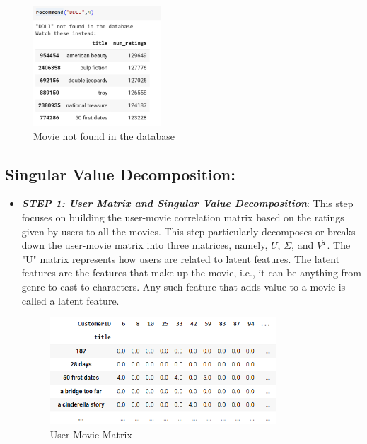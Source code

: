 \documentclass[a4paper,10pt]{article}
\begin{document}
\begin{enumerate}
\begin{itemize}
\begin{figure}[H]
        
        \centering
        \includegraphics[height=4.5cm]{figures/not_in_db.png}
        \caption{Movie not found in the database}
        \label{not in db}
\end{figure}
\end{itemize}


\subsection{Singular Value Decomposition:}
    \vspace{2pt}
    
    \begin{itemize}
        \item \textbf{\textit{STEP 1: User Matrix and Singular Value Decomposition}}: This step focuses on building the user-movie correlation matrix based on the ratings given by users to all the movies. 
     This step particularly decomposes or breaks down the user-movie matrix into three matrices, namely, \( U \), \( \Sigma \), and \( V^T \). The "U" matrix represents how users are related to latent features. The latent features are the features that make up the movie, i.e., it can be anything from genre to cast to characters. Any such feature that adds value to a movie is called a latent feature.

\begin{figure}[H]
        
        \centering
        \includegraphics[height=4cm]{figures/user_movie.png}
        \caption{User-Movie Matrix}
        \label{User_movie}
\end{figure}


\end{itemize}
\end{enumerate}
\end{document}
